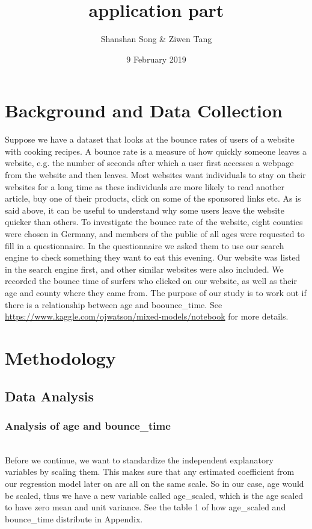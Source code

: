 \documentclass[12pt]{article}
\title{application part}
\author{Shanshan Song & Ziwen Tang}
\date{9 February 2019}
\begin{document}
\maketitle

\section{Background and Data Collection}
     \newcommand\iid{i.i.d.}
     \newcommand\pN{\mathcal{N}}
    Suppose we have a dataset that looks at the bounce rates of users of a website with cooking recipes. A bounce rate is a measure of how quickly someone leaves a website, e.g. the number of seconds after which a user first accesses a webpage from the website and then leaves. Most websites want individuals to stay on their websites for a long time as these individuals are more likely to read another article, buy one of their products, click on some of the sponsored links etc. As is said above, it can be useful to understand why some users leave the website quicker than others. To investigate the bounce rate of the website, eight counties were chosen in Germany, and members of the public of all ages were requested  to fill in a questionnaire. In the questionnaire we asked them to use our search engine to check something they want to eat this evening. Our website was listed in the search engine first, and other similar websites were also included. We recorded the bounce time of surfers who clicked on our website, as well as their age and county where they came from. The purpose of our study is to work out if there is a relationship between age and boounce\_time.  See \url{https://www.kaggle.com/ojwatson/mixed-models/notebook} for more details.
\section{Methodology}
\subsection{Data Analysis}
\subsubsection{Analysis of age and bounce\_time}
    \\Before we continue, we want to standardize the independent explanatory variables by scaling them. This makes sure that any estimated coefficient from our regression model later on are all on the same scale. So in our case, age would be scaled, thus we have a new variable called age\_scaled, which is the age scaled to have zero mean and unit variance. See the table 1 of how age\_scaled and bounce\_time distribute in Appendix.
\end{document}
